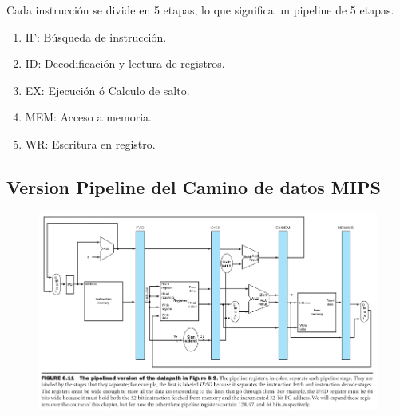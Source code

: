 \documentclass{article}
\begin{document}
Cada instrucción se divide en 5 etapas, lo que significa un pipeline de 5 etapas. 

\begin{enumerate}
    \item IF: Búsqueda de instrucción.
    \item ID: Decodificación y lectura de registros.
    \item EX: Ejecución ó Calculo de salto.
    \item MEM: Acceso a memoria.
    \item WR: Escritura en registro.
\end{enumerate}

\newpage
\subsection{Version Pipeline del Camino de datos MIPS}
\begin{figure}[h!]
    \includegraphics[width=\linewidth]{imagenes/pipeline/pipeline-datapath.png}
\end{figure}
\end{document}
